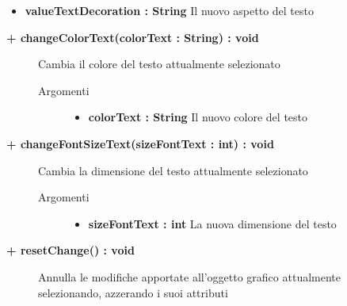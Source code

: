 \begin{description}
\begin{description}
\begin{description}
\begin{itemize}
					\item \textbf{valueTextDecoration : String} \hfill
					Il nuovo aspetto del testo
				\end{itemize}
				
		\end{description}
	\end{description}
	
	\begin{description}
		\item[\textbf{\color{blue}+ changeColorText(colorText : String) : void	 	}] \hfill
		Cambia il colore del testo attualmente selezionato
			
		\begin{description}
			\item[Argomenti] \hfill
				\begin{itemize}
				
					\item \textbf{colorText : String} \hfill
					Il nuovo colore del testo
				\end{itemize}
				
		\end{description}
	\end{description}
	
	\begin{description}
		\item[\textbf{\color{blue}+ changeFontSizeText(sizeFontText : int) : void	 	}] \hfill
		Cambia la dimensione del testo attualmente selezionato
			
		\begin{description}
			\item[Argomenti] \hfill
				\begin{itemize}
				
					\item \textbf{sizeFontText : int} \hfill
					La nuova dimensione del testo
				\end{itemize}
				
		\end{description}
	\end{description}
	
	
	\begin{description}
		\item[\textbf{\color{blue}+ resetChange() : void 	}] \hfill
		Annulla le modifiche apportate all'oggetto grafico attualmente selezionando, azzerando i suoi attributi


\end{description}
\end{description}
